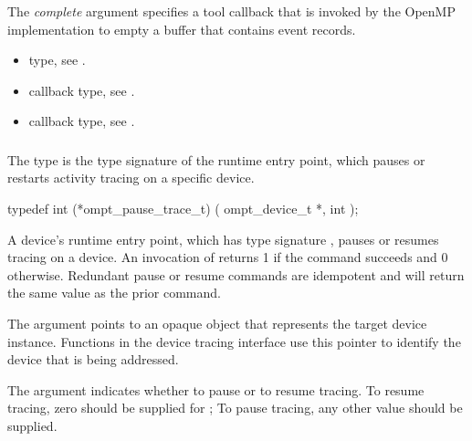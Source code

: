 The \emph{complete} argument specifies a tool callback that is invoked 
by the OpenMP implementation to empty a buffer that contains event records.

\crossreferences
\begin{itemize}
\item {} type, see .

\item {} callback type, 
see .

\item {} callback type, 
see .
\end{itemize}



\subsubsection{}
\label{sec:ompt_pause_trace_t}

\summary
The  type is the type signature of the 
 runtime entry point, which pauses or 
restarts activity tracing on a specific device.

\format
\begin{ccppspecific}
\begin{omptInquiry}
typedef int (*ompt_pause_trace_t) (
  ompt_device_t *,
  int 
);
\end{omptInquiry}
\end{ccppspecific}

\descr
A device's  runtime entry point, which has type
signature , pauses or resumes tracing on a device.
An invocation of  returns 1 if the command
succeeds and 0 otherwise. Redundant pause or resume commands are 
idempotent and will return the same value as the prior command. 

\argdesc
The  argument points to an opaque object that represents
the target device instance. Functions in the device tracing interface
use this pointer to identify the device that is being addressed.

The  argument indicates whether to pause or to resume 
tracing. To resume tracing, zero should be supplied for ;
To pause tracing, any other value should be supplied.

